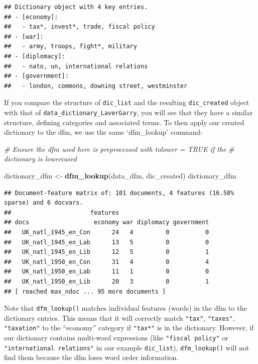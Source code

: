 \documentclass[
]{book}
\newenvironment{Shaded}{\begin{snugshade}}{\end{snugshade}}
\newcommand{\CommentTok}[1]{\textcolor[rgb]{0.56,0.35,0.01}{\textit{#1}}}
\newcommand{\FunctionTok}[1]{\textcolor[rgb]{0.13,0.29,0.53}{\textbf{#1}}}
\newcommand{\NormalTok}[1]{#1}
\newcommand{\OtherTok}[1]{\textcolor[rgb]{0.56,0.35,0.01}{#1}}
\begin{document}
\begin{verbatim}
## Dictionary object with 4 key entries.
## - [economy]:
##   - tax*, invest*, trade, fiscal policy
## - [war]:
##   - army, troops, fight*, military
## - [diplomacy]:
##   - nato, un, international relations
## - [government]:
##   - london, commons, downing street, westminster
\end{verbatim}

If you compare the structure of \texttt{dic\_list} and the resulting \texttt{dic\_created} object with that of \texttt{data\_dictionary\_LaverGarry}, you will see that they have a similar structure, defining categories and associated terms. To then apply our created dictionary to the dfm, we use the same `dfm\_lookup' command:

\begin{Shaded}
\begin{Highlighting}[]
\CommentTok{\# Ensure the dfm used here is preprocessed with tolower = TRUE if the}
\CommentTok{\# dictionary is lowercased}

\NormalTok{dictionary\_dfm }\OtherTok{\textless{}{-}} \FunctionTok{dfm\_lookup}\NormalTok{(data\_dfm, dic\_created)}
\NormalTok{dictionary\_dfm}
\end{Highlighting}
\end{Shaded}

\begin{verbatim}
## Document-feature matrix of: 101 documents, 4 features (16.58% sparse) and 6 docvars.
##                      features
## docs                  economy war diplomacy government
##   UK_natl_1945_en_Con      24   4         0          0
##   UK_natl_1945_en_Lab      13   5         0          0
##   UK_natl_1945_en_Lib      12   5         0          1
##   UK_natl_1950_en_Con      31   4         0          4
##   UK_natl_1950_en_Lab      11   1         0          0
##   UK_natl_1950_en_Lib      20   3         0          1
## [ reached max_ndoc ... 95 more documents ]
\end{verbatim}

Note that \texttt{dfm\_lookup()} matches individual features (words) in the dfm to the dictionary entries. This means that it will correctly match \texttt{"tax"}, \texttt{"taxes"}, \texttt{"taxation"} to the ``economy'' category if \texttt{"tax*"} is in the dictionary. However, if our dictionary contains multi-word expressions (like \texttt{"fiscal\ policy"} or \texttt{"international\ relations"} in our example \texttt{dic\_list}), \texttt{dfm\_lookup()} will not find them because the dfm loses word order information.
\end{document}
